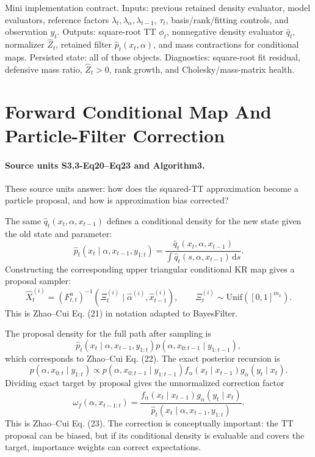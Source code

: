 \documentclass[11pt]{article}
\newcommand{\dd}{\,\mathrm d}
\begin{document}
Mini implementation contract.  Inputs: previous retained density evaluator,
model evaluators, reference factors \(\lambda_t,\lambda_\alpha,\lambda_{t-1}\),
\(\tau_t\), basis/rank/fitting controls, and observation \(y_t\).  Outputs:
square-root TT \(\phi_t\), nonnegative density evaluator \(\widehat q_t\),
normalizer \(\widehat Z_t\), retained filter \(\widehat p_t(x_t,\alpha)\), and
mass contractions for conditional maps.  Persisted state: all of those objects.
Diagnostics: square-root fit residual, defensive mass ratio, \(\widehat Z_t>0\),
rank growth, and Cholesky/mass-matrix health.

\section{Forward Conditional Map And Particle-Filter Correction}

\paragraph{Source units S3.3-Eq20--Eq23 and Algorithm3.}
These source units answer: how does the squared-TT approximation become a
particle proposal, and how is approximation bias corrected?

The same \(\widehat q_t(x_t,\alpha,x_{t-1})\) defines a conditional density for
the new state given the old state and parameter:
\[
    \widehat p_t(x_t\mid \alpha,x_{t-1},y_{1:t})
    =
    \frac{\widehat q_t(x_t,\alpha,x_{t-1})}
    {\int \widehat q_t(s,\alpha,x_{t-1})\dd s}.
    \tag{F1}
\]
Constructing the corresponding upper triangular conditional KR map gives a
proposal sampler:
\[
    \widehat X_t^{(i)}
    =
    (F_{t,t}^{u})^{-1}
    \left(\Xi_t^{(i)}\mid \widehat\alpha^{(i)},\widehat x_{t-1}^{(i)}\right),
    \qquad
    \Xi_t^{(i)}\sim\mathrm{Unif}([0,1]^{m_x}).
    \tag{F2}
\]
This is Zhao--Cui Eq. (21) in notation adapted to BayesFilter.

The proposal density for the full path after sampling is
\[
    \widehat p_t(x_t\mid \alpha,x_{t-1},y_{1:t})
    p(\alpha,x_{0:t-1}\mid y_{1:t-1}),
    \tag{F3}
\]
which corresponds to Zhao--Cui Eq. (22).  The exact posterior recursion is
\[
    p(\alpha,x_{0:t}\mid y_{1:t})
    \propto
    p(\alpha,x_{0:t-1}\mid y_{1:t-1})
    f_\alpha(x_t\mid x_{t-1})
    g_\alpha(y_t\mid x_t).
\]
Dividing exact target by proposal gives the unnormalized correction factor
\[
    \omega_f(\alpha,x_{t-1:t})
    =
    \frac{
    f_\alpha(x_t\mid x_{t-1})g_\alpha(y_t\mid x_t)}
    {\widehat p_t(x_t\mid \alpha,x_{t-1},y_{1:t})}.
    \tag{F4}
\]
This is Zhao--Cui Eq. (23).  The correction is conceptually important: the TT
proposal can be biased, but if its conditional density is evaluable and covers
the target, importance weights can correct expectations.
\end{document}
